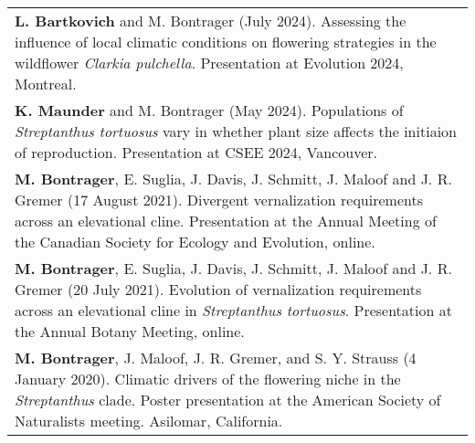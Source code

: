 \documentclass[letterpaper,11pt,oneside]{article}
\begin{document}
\def\arraystretch{1.2}
\noindent \begin{tabular}{@{} >{\raggedright\arraybackslash}p{17.2cm}}
\hangindent=5mm\textbf{L. Bartkovich} and M. Bontrager (July 2024). Assessing the influence of local climatic conditions on flowering strategies in the wildflower \textit{Clarkia pulchella}. Presentation at Evolution 2024, Montreal. \\
\hangindent=5mm\textbf{K. Maunder} and M. Bontrager (May 2024). Populations of \textit{Streptanthus tortuosus} vary in whether plant size affects the initiaion of reproduction. Presentation at CSEE 2024, Vancouver. \\
\hangindent=5mm\textbf{M. Bontrager}, E. Suglia, J. Davis, J. Schmitt, J. Maloof and J. R. Gremer (17 August 2021). Divergent vernalization requirements across an elevational cline. Presentation at the Annual Meeting of the Canadian Society for Ecology and Evolution, online. \\
\hangindent=5mm\textbf{M. Bontrager}, E. Suglia, J. Davis, J. Schmitt, J. Maloof and J. R. Gremer (20 July 2021). Evolution of vernalization requirements across an elevational cline in \textit{Streptanthus tortuosus}. Presentation at the Annual Botany Meeting, online. \\
\hangindent=5mm\textbf{M. Bontrager}, J. Maloof, J. R. Gremer, and S. Y. Strauss (4 January 2020). Climatic drivers of the flowering niche in the \textit{Streptanthus} clade. Poster presentation at the American Society of Naturalists meeting. Asilomar, California. \\


\end{tabular}
\end{document}
